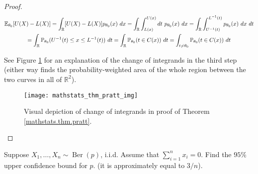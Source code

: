 \begin{proof}

\begin{multline*}
\E_{\theta_0}  [U(X) - L(X)]  = \int_{\mathbb{R}}  [U(X) - L(X)]  p_{\theta_0}(x) \ dx = \int_{\mathbb{R}} \int_{L(x)}^{U(x)} dt \ p_{\theta_0}(x) \ dx
 = \int_{\mathbb{R}} \int_{U^{-1}(t)}^{L^{-1}(t)} p_{\theta_0}(x) \ dx \ dt
 \\ = \int_{\mathbb{R}} \mathbb{P}_{\theta_0}(U^{-1}(t) \leq x \leq L^{-1}(t)) \ dt = \int_{\mathbb{R}} \mathbb{P}_{\theta_0}(t \in C(x)) \ dt 
 = \int_{t \neq \theta_0} \mathbb{P}_{\theta_0}(t \in C(x)) \ dt 
\end{multline*}

See Figure \ref{mathstats.fig.pratt.thm.proof} for an explanation of the change of integrands in the third step (either way finds the probability-weighted area of the whole region between the two curves in all of \(\mathbb{R}^2\)).

\begin{figure}[htbp]
\begin{center}
\texttt{[image: mathstats\_thm\_pratt\_img]}
\caption{Visual depiction of change of integrands in proof of Theorem \ref{mathstats.thm.pratt}.}
\label{mathstats.fig.pratt.thm.proof}
\end{center}
\end{figure}


\end{proof}

\begin{example}

Suppose \(X_1, \ldots, X_n \sim \operatorname{Ber}(p)\), i.i.d. Assume that \(\sum_{i=1}^n x_i = 0\). Find the \(95\%\) upper confidence bound for \(p\). (it is approximately equal to \(3/n\)). 

\end{example}

